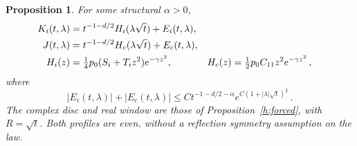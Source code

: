 \documentclass[11pt]{amsart}
\newtheorem{proposition}{Proposition}[section]
\theoremstyle{definition}
\theoremstyle{remark}
\numberwithin{equation}{section}
\begin{document}
\begin{proposition}\label{p:profile}
For some structural $\alpha>0$,
\begin{align}\label{e:profile}
 K_i(t,\lambda)&=t^{-1-d/2}H_i(\lambda\sqrt t)+E_i(t,\lambda),\notag\\
 J(t,\lambda)&=t^{-1-d/2}H_c(\lambda\sqrt t)+E_c(t,\lambda),\\
 H_i(z)&=\tfrac14p_0(S_i+T_i z^2)e^{-\gamma z^2},
 &H_c(z)&=\tfrac12p_0C_{11}z^2e^{-\gamma z^2}\notag\, ,
\end{align}
where
\begin{equation}\label{e:profile-error}
 |E_i(t,\lambda)|+|E_c(t,\lambda)|
 \leq Ct^{-1-d/2-\alpha}e^{C(1+|\lambda|\sqrt t)^2}\, .
\end{equation}
The complex disc and real window are those of Proposition~\ref{h:forced}, with $R=\sqrt t$. Both profiles are even, without a reflection symmetry assumption on the law.
\end{proposition}
\end{document}
